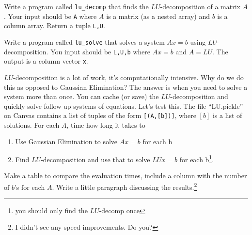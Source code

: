 \documentclass[11pt,letterpaper]{article}
\begin{document}
\begin{problem}
\label{prob:lu}
  Write a program called \texttt{lu\_decomp} that finds the $LU$-decomposition of a matrix $A$. Your input should be \texttt{A} where $A$ is a matrix (as a nested array) and $b$ is a column array. Return a tuple \texttt{L,U}.
\end{problem}

\begin{problem}
 Write a program called \texttt{lu\_solve} that solves a system $Ax=b$ using $LU$-decomposition. You input should be \texttt{L,U,b} where $Ax=b$ and $A=LU$. The output is a column vector \texttt{x}.
\end{problem}



\begin{problem}
$LU$-decomposition is a lot of work, it's computationally intensive. Why do we do this as opposed to Gaussian Elimination? The answer is when you need to solve a system more than once. You can cache (or save) the $LU$-decomposition and quickly solve follow up systems of equations. Let's test this. The file ``LU.pickle'' on Canvas contains a list of tuples of the form \texttt{[(A,[b])]}, where $[b]$ is a list of solutions. For each $A$, time how long it takes to 
\begin{enumerate}
 \item Use Gaussian Elimination to solve $Ax=b$ for each b
 \item Find $LU$-decomposition and use that to solve $LUx=b$ for each b\footnote{you should only find the $LU$-decomp once}.
\end{enumerate}
Make a table to compare the evaluation times, include a column with the number of $b$'s for each $A$. Write a little paragraph discussing the results.\footnote{I didn't see any speed improvements. Do you?} 
\end{problem}
\end{document}

